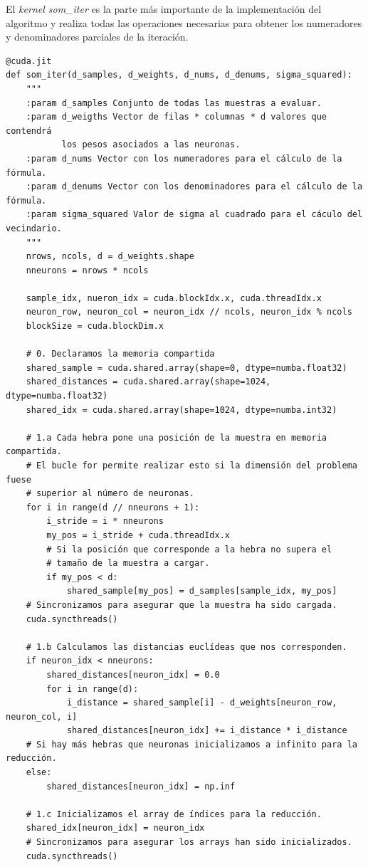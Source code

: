 El \textit{kernel som\_iter} es la parte más importante de la implementación del algoritmo y realiza todas las operaciones necesarias para obtener los numeradores y denominadores parciales de la iteración.



\begin{code}
\begin{verbatim}
@cuda.jit
def som_iter(d_samples, d_weights, d_nums, d_denums, sigma_squared):
    """
    :param d_samples Conjunto de todas las muestras a evaluar.
    :param d_weigths Vector de filas * columnas * d valores que contendrá 
           los pesos asociados a las neuronas.
    :param d_nums Vector con los numeradores para el cálculo de la fórmula.
    :param d_denums Vector con los denominadores para el cálculo de la fórmula.
    :param sigma_squared Valor de sigma al cuadrado para el cáculo del vecindario.
    """
    nrows, ncols, d = d_weights.shape
    nneurons = nrows * ncols
    
    sample_idx, nueron_idx = cuda.blockIdx.x, cuda.threadIdx.x
    neuron_row, neuron_col = neuron_idx // ncols, neuron_idx % ncols
    blockSize = cuda.blockDim.x
       
    # 0. Declaramos la memoria compartida
    shared_sample = cuda.shared.array(shape=0, dtype=numba.float32)
    shared_distances = cuda.shared.array(shape=1024, dtype=numba.float32)
    shared_idx = cuda.shared.array(shape=1024, dtype=numba.int32)
    
    # 1.a Cada hebra pone una posición de la muestra en memoria compartida.
    # El bucle for permite realizar esto si la dimensión del problema fuese
    # superior al número de neuronas.
    for i in range(d // nneurons + 1):
        i_stride = i * nneurons
        my_pos = i_stride + cuda.threadIdx.x
        # Si la posición que corresponde a la hebra no supera el
        # tamaño de la muestra a cargar.
        if my_pos < d: 
            shared_sample[my_pos] = d_samples[sample_idx, my_pos]
    # Sincronizamos para asegurar que la muestra ha sido cargada.
    cuda.syncthreads()
    
    # 1.b Calculamos las distancias euclídeas que nos corresponden.
    if neuron_idx < nneurons:
        shared_distances[neuron_idx] = 0.0
        for i in range(d):
            i_distance = shared_sample[i] - d_weights[neuron_row, neuron_col, i]
            shared_distances[neuron_idx] += i_distance * i_distance
    # Si hay más hebras que neuronas inicializamos a infinito para la reducción.
    else: 
        shared_distances[neuron_idx] = np.inf
    
    # 1.c Inicializamos el array de índices para la reducción.
    shared_idx[neuron_idx] = neuron_idx
    # Sincronizamos para asegurar los arrays han sido inicializados.
    cuda.syncthreads()    
\end{verbatim}
\label{code:somiter1}
\end{code}

